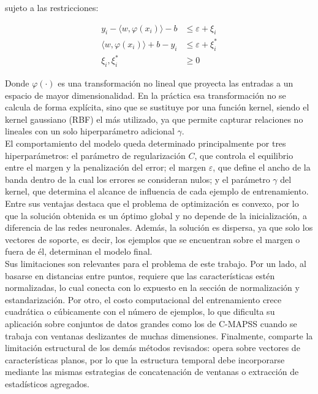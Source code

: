 sujeto a las restricciones:

\[
\begin{aligned}
y_i - \langle w, \varphi(x_i)\rangle - b &\leq \varepsilon + \xi_i \\
\langle w, \varphi(x_i)\rangle + b - y_i &\leq \varepsilon + \xi_i^{*} \\
\xi_i, \xi_i^{*} &\geq 0
\end{aligned}
\]

Donde $\varphi(\cdot)$ es una transformación no lineal que proyecta las entradas a un espacio de mayor dimensionalidad. En la práctica esa transformación no se calcula de forma explícita, sino que se sustituye por una función kernel, siendo el kernel gaussiano (RBF) el más utilizado, ya que permite capturar relaciones no lineales con un solo hiperparámetro adicional $\gamma$.\\[.15cm]

El comportamiento del modelo queda determinado principalmente por tres hiperparámetros: el parámetro de regularización $C$, que controla el equilibrio entre el margen y la penalización del error; el margen $\varepsilon$, que define el ancho de la banda dentro de la cual los errores se consideran nulos; y el parámetro $\gamma$ del kernel, que determina el alcance de influencia de cada ejemplo de entrenamiento.\\[.15cm]

Entre sus ventajas destaca que el problema de optimización es convexo, por lo que la solución obtenida es un óptimo global y no depende de la inicialización, a diferencia de las redes neuronales. Además, la solución es dispersa, ya que solo los vectores de soporte, es decir, los ejemplos que se encuentran sobre el margen o fuera de él, determinan el modelo final.\\[.15cm]

Sus limitaciones son relevantes para el problema de este trabajo. Por un lado, al basarse en distancias entre puntos, requiere que las características estén normalizadas, lo cual conecta con lo expuesto en la sección de normalización y estandarización. Por otro, el costo computacional del entrenamiento crece cuadrática o cúbicamente con el número de ejemplos, lo que dificulta su aplicación sobre conjuntos de datos grandes como los de C-MAPSS cuando se trabaja con ventanas deslizantes de muchas dimensiones. Finalmente, comparte la limitación estructural de los demás métodos revisados: opera sobre vectores de características planos, por lo que la estructura temporal debe incorporarse mediante las mismas estrategias de concatenación de ventanas o extracción de estadísticos agregados.\\[.15cm]

